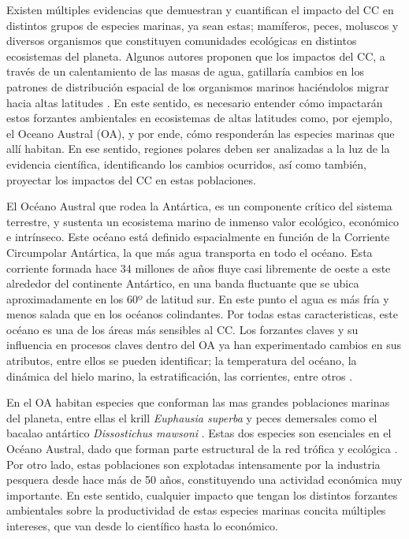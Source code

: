 \documentclass{sydneythesis}
\begin{document}
Existen múltiples evidencias que demuestran y cuantifican el impacto del CC en distintos grupos de especies marinas, ya sean estas; mamíferos, peces, moluscos y diversos organismos que constituyen comunidades ecológicas en distintos ecosistemas del planeta. Algunos autores proponen que los impactos del CC, a través de un calentamiento de las masas de agua, gatillaría cambios en los patrones de distribución espacial de los organismos marinos haciéndolos migrar hacia altas latitudes \autocite{Cheung2010a,Kortsch2015,Melbourne-Thomas2021}. En este sentido, es necesario entender cómo impactarán estos forzantes ambientales en ecosistemas de altas latitudes como, por ejemplo, el Oceano Austral (OA), y por ende, cómo responderán las especies marinas que allí habitan. En ese sentido, regiones polares deben ser analizadas a la luz de la evidencia científica, identificando los cambios ocurridos, así como también, proyectar los impactos del CC en estas poblaciones.

El Océano Austral que rodea la Antártica, es un componente crítico del sistema terrestre, y sustenta un ecosistema marino de inmenso valor ecológico, económico e intrínseco. Este océano está definido espacialmente en función de la Corriente Circumpolar Antártica, la que más agua transporta en todo el océano. Esta corriente formada hace 34 millones de años fluye casi libremente de oeste a este alrededor del continente Antártico, en una banda fluctuante que se ubica aproximadamente en los 60º de latitud sur. En este punto el agua es más fría y menos salada que en los océanos colindantes. Por todas estas caracteristicas, este océano es una de los áreas más sensibles al CC. Los forzantes claves y su influencia en procesos claves dentro del OA ya han experimentado cambios en sus atributos, entre ellos se pueden identificar; la temperatura del océano, la dinámica del hielo marino, la estratificación, las corrientes, entre otros \autocite{Sylvester2021,Morley2020}.

En el OA habitan especies que conforman las mas grandes poblaciones marinas del planeta, entre ellas el krill \emph{Euphausia superba} y peces demersales como el bacalao antártico \emph{Dissostichus mawsoni} \autocite{Atkinson2009,Veytia2020,Pinones2016}. Estas dos especies son esenciales en el Océano Austral, dado que forman parte estructural de la red trófica y ecológica \autocite{Pinones2016,Atkinson2009}. Por otro lado, estas poblaciones son explotadas intensamente por la industria pesquera desde hace más de 50 años, constituyendo una actividad económica muy importante. En este sentido, cualquier impacto que tengan los distintos forzantes ambientales sobre la productividad de estas especies marinas concita múltiples intereses, que van desde lo científico hasta lo económico.
\end{document}
